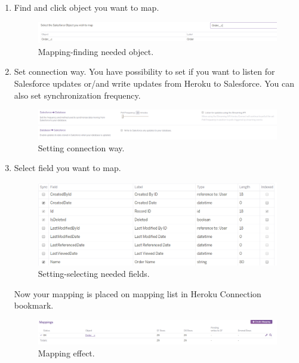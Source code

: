 \documentclass[12pt,a4paper]{article}
\begin{document}
\begin{enumerate}
\item Find and click object you want to map.
\begin{figure}[H]
	\centering
	\includegraphics[width=1\textwidth]{images/connect7.PNG}
	\caption{Mapping-finding needed object.}
	\label{fig:cong}
\end{figure}

\item Set connection way. You have possibility to set if you want to listen for Salesforce updates or/and write updates from Heroku to Salesforce. You can also set synchronization frequency. 
\begin{figure}[H]
	\centering
	\includegraphics[width=1\textwidth]{images/connect8.PNG}
	\caption{Setting connection way.}
	\label{fig:conh}
\end{figure}

\item Select field you want to map. 

\begin{figure}[H]
	\centering
	\includegraphics[width=1\textwidth]{images/connect9.PNG}
	\caption{Setting-selecting needed fields.}
	\label{fig:coni}
\end{figure}

Now your mapping is placed on mapping list in Heroku Connection bookmark. 

\begin{figure}[H]
	\centering
	\includegraphics[width=1\textwidth]{images/connect10.PNG}
	\caption{Mapping effect.}
	\label{fig:conj}
\end{figure}


\end{enumerate} 
\end{document}
